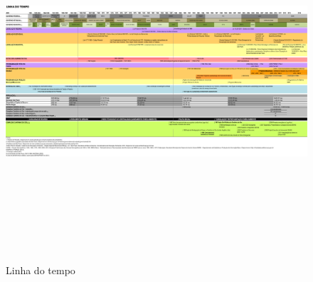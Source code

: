 	\begin{landscape}
		\begin{figure}
			\centering
			\caption{Linha do tempo}
			\includegraphics[height=12.6cm,keepaspectratio]{img/matsunaga_linha}
			\label{fig:matsunaga_linha}
		\end{figure}
	\end{landscape}	
	
	
	\postextual
	
	
	
	
	\renewcommand{\glossaryname}{Glossário}
	\renewcommand*{\glsseeformat}[3][\seename]{\textit{#1}
		\glsseelist{#2}}
	
